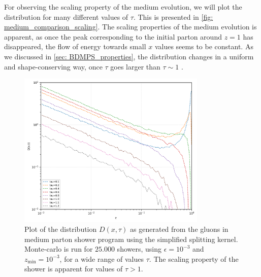 \documentclass[main.tex]{subfiles}
\begin{document}
For observing the scaling property of the medium evolution, we will plot the distribution for many different values of \(\tau\). This is presented in \autoref{fig: medium_comparison_scaling}. The scaling properties of the medium evolution is apparent, as once the peak corresponding to the initial parton around \(z=1\) has disappeared, the flow of energy towards small \(x\) values seems to be constant. As we discussed in \autoref{sec: BDMPS_properties}, the distribution changes in a uniform and shape-conserving way, once \(\tau\) goes larger than \(\tau \sim 1\) . 
\begin{figure}[htb]
    \centering
    \includegraphics[width=9cm]{pictures/plots/distributions/medium/medium_scaling_25k.png}
    \caption{Plot of the distribution \(D(x,\tau)\) as generated from the gluons in medium parton shower program using the simplified splitting kernel. Monte-carlo is run for \(25.000\) showers, using \(\epsilon=10^{-3}\) and \(z_{\text{min}} = 10^{-3}\), for a wide range of values \(\tau\). The scaling property of the shower is apparent for values of \(\tau > 1\).}
    \label{fig: medium_comparison_scaling}
\end{figure}
\end{document}
